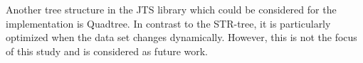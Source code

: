 \documentclass[a4paper,12pt]{article}
\begin{document}
Another tree structure in the JTS library 
which could be considered for the implementation is Quadtree.  
In contrast to the STR-tree, it is particularly optimized when the data set changes dynamically.
However, this is not the focus of this study and is considered as future work.
\newpage
\end{document}
